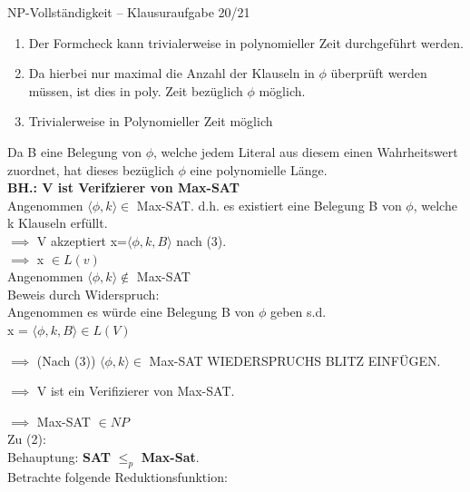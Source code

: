\documentclass[answers]{submit}
\begin{document}
\begin{exercise}[6]{NP-Vollständigkeit -- Klausuraufgabe 20/21}
{    \begin{enumerate}
      \item Der Formcheck kann trivialerweise in polynomieller Zeit durchgeführt werden.
      \item Da hierbei nur maximal die Anzahl der Klauseln in $\phi$ überprüft werden müssen, ist dies in poly. Zeit bezüglich $\phi$ möglich.
      \item Trivialerweise in Polynomieller Zeit möglich
    \end{enumerate}

    Da B eine Belegung von $\phi$, welche jedem Literal aus diesem einen Wahrheitswert zuordnet, hat dieses bezüglich $\phi$ eine polynomielle Länge. \\

    \textbf{BH.: V ist Verifzierer von Max-SAT} \\

    Angenommen $\langle \phi,k \rangle \in $ Max-SAT. d.h. es existiert eine Belegung B von $\phi$, welche k Klauseln erfüllt. \\

    $\implies$ V akzeptiert x=$\langle \phi,k,B \rangle$ nach (3). \\

    $\implies$ x $\in L(v)$ \\

    Angenommen $\langle \phi,k \rangle \notin $ Max-SAT \\

    Beweis durch Widerspruch: \\

    Angenommen es würde eine Belegung B von $\phi$ geben s.d. \\

    x = $\langle \phi,k,B \rangle \in L(V)$

    $\implies$ (Nach (3)) $\langle \phi,k \rangle \in $ Max-SAT WIEDERSPRUCHS BLITZ EINFÜGEN.

    $\implies$ V ist ein Verifizierer von Max-SAT.

    $\implies$ Max-SAT $\in NP$ \\

    Zu (2): \\

    Behauptung: \textbf{SAT} $\leq_p$ \textbf{Max-Sat}. \\

    Betrachte folgende Reduktionsfunktion: \\

}
\end{exercise}
\end{document}
